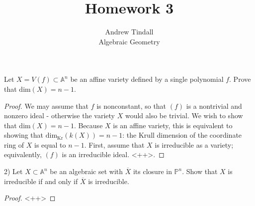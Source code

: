 \documentclass[12pt]{article}
\theoremstyle{definition}
\newenvironment{problem}[2][Problem]{\begin{trivlist}
\item[\hskip \labelsep {\bfseries #1}\hskip \labelsep {\bfseries #2.}]}{\end{trivlist}}
\begin{document}
 
 
\title{Homework 3}
\author{Andrew Tindall\\
Algebraic Geometry}
 
\maketitle
\begin{problem}{1}
    Let $X = V(f)\subset \mathbb A^n$ be an affine variety defined by a single polynomial $f$. Prove that $\text{dim}(X) = n-1$.
    \begin{proof}
        We may assume that $f$ is nonconstant, so that $(f)$ is a nontrivial and nonzero ideal - otherwise the variety $X$ would also be trivial. 
        We wish to show that $\text{dim}(X) = n-1$. 
        Because $X$ is an affine variety, this is equivalent to showing that $\text{dim}_{\text{Kr}}(k(X))= n-1$: the Krull dimension of the coordinate ring of $X$ is equal to $n-1$.
        First, assume that $X$ is irreducible as a variety; equivalently, $(f)$ is an irreducible ideal. <++>. 

    \end{proof}
\end{problem}
\begin{problem}(2)
    Let $X \subset \mathbb A^n$ be an algebraic set with $\overline X$ its closure in $\mathbb P^n$. Show that $X$ is irreducible if and only if $\overline X$ is irreducible. 
    \begin{proof}
        <++>
    \end{proof}
\end{problem}
\end{document}
